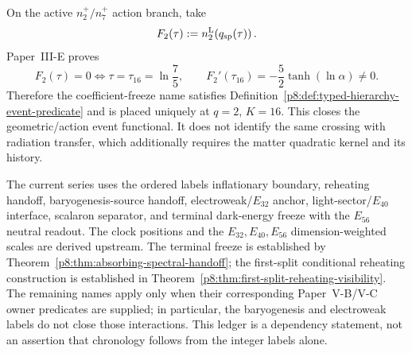 \documentclass[12pt,a4paper]{article}
\begin{document}
\begin{corollary}[Derived \(K=16\) coefficient-freeze event predicate]
\label{p8:cor:derived-k16-coefficient-freeze-event}
On the active \(n_2^+/n_7^+\) action branch, take
\[
 F_2(\tau):=
 n_2^{\rm L}\!\left(q_{\rm sp}(\tau)\right).
\]
Paper~III-E proves
\begin{equation}
\label{p8:eq:derived-k16-event-predicate}
 \boxed{F_2(\tau)=0\Longleftrightarrow
 \tau=\tau_{16}=\ln\frac75,\qquad
 F_2'(\tau_{16})=-\frac52\tanh(\ln\alpha)\ne0.}
\end{equation}
Therefore the coefficient-freeze name satisfies
Definition~\ref{p8:def:typed-hierarchy-event-predicate} and is placed
uniquely at \(q=2\), \(K=16\).  This closes the geometric/action event
functional.  It does not identify the same crossing with radiation transfer,
which additionally requires the matter quadratic kernel and its history.
\end{corollary}

\begin{remark}
\label{p8:rem:typed-seven-event-ledger}
The current series uses the ordered labels inflationary boundary,
reheating handoff, baryogenesis-source handoff, electroweak/\(E_{32}\) anchor,
light-sector/\(E_{40}\) interface, scalaron separator, and terminal dark-energy
freeze with the \(E_{56}\) neutral readout.  The clock positions and the
\(E_{32},E_{40},E_{56}\) dimension-weighted scales are derived upstream.  The
terminal freeze is established by
Theorem~\ref{p8:thm:absorbing-spectral-handoff}; the first-split
conditional reheating construction is established in
Theorem~\ref{p8:thm:first-split-reheating-visibility}.  The remaining names
apply only when their corresponding Paper~V-B/V-C owner predicates are
supplied; in particular, the baryogenesis and electroweak labels do not close
those interactions.  This ledger is a dependency statement, not an assertion
that chronology follows from the integer labels alone.
\end{remark}
\end{document}
